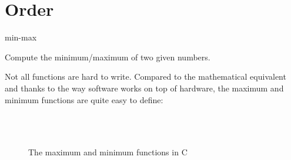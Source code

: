 \documentclass[main.tex]{subfiles}
\begin{document}
\chapter{Order}

\begin{libraryfile}
  \begin{algorithm}{1}{1}{min-max}
    \begin{algorithm-description}
        Compute the minimum/maximum of two given numbers.
    \end{algorithm-description}
    \begin{algorithm-explanation}
    Not all functions are hard to write.
    Compared to the mathematical equivalent and thanks to the way software works on top of hardware, the maximum and minimum functions are quite easy to define:
    \begin{figure}[H]
        \centering
        \inputminted[firstline=4, lastline=4]{c}{\lib{c}{order.h}}
        \vspace{-27px}
        \inputminted[firstline=4, lastline=4]{c}{\lib{c}{order.c}}
        \inputminted[firstline=7, lastline=7]{c}{\lib{c}{order.h}}
        \vspace{-27px}
        \inputminted[firstline=6, lastline=6]{c}{\lib{c}{order.c}}
        \caption{The maximum and minimum functions in C}
    \end{figure}
  \end{algorithm-explanation}
  \end{algorithm}
\end{libraryfile}
\end{document}

